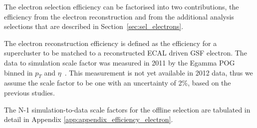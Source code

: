 
The electron selection efficiency can be factorised into two contributions,
the efficiency from the electron reconstruction and from the additional
analysis selections that are described in Section~\ref{sec:sel_electrons}.

The electron reconstruction efficiency is defined as the efficiency for a
supercluster to be matched to a reconstructed ECAL driven GSF electron.
The data to simulation scale factor was measured in 2011 by the Egamma POG binned in
$p_T$ and $\eta$~\cite{ref:egamma_eff_gsf}. This measurement is not yet
available in 2012 data, thus we assume the scale factor to be one with an 
uncertainty of 2\%, based on the previous studies.

The N-1 simulation-to-data scale factors for the offline selection
are tabulated in detail in Appendix \ref{app:appendix_efficiency_electron}. 

